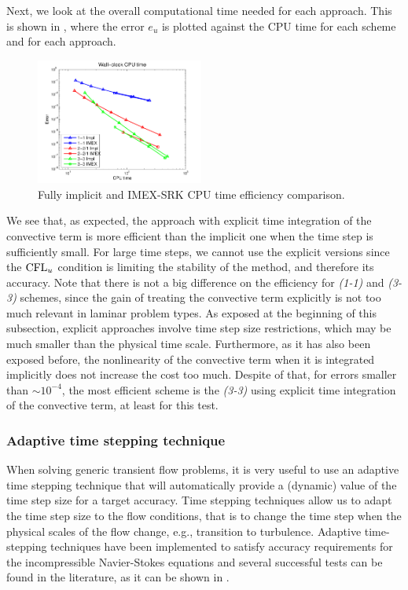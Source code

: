 Next, we look at the overall computational time needed for each approach. This is shown in , where the error $e_u$ is plotted against the CPU time for each scheme and for each approach.
\begin{figure}[h!]
  \centering
  \includegraphics[width=0.49\textwidth]{Figures/Chapter6/cylinder/Efficiency_impl_expl}  
  \caption{Fully implicit and IMEX-SRK CPU time efficiency comparison.}
  \label{fig-IMEX_RK_cyl_effi_impl_expl}
\end{figure}
We see that, as expected, the approach with explicit time integration of the convective term is more efficient than the implicit one when the time step is sufficiently small. For large time steps, we cannot use the explicit versions since the ${\rm CFL}_u$ condition is limiting the stability of the method, and therefore its accuracy. Note that there is not a big difference on the efficiency for \textit{(1-1)} and \textit{(3-3)} schemes, since the gain of treating the convective term explicitly is not too much relevant in laminar problem types. As exposed at the beginning of this subsection, explicit approaches involve time step size restrictions, which may be much smaller than the physical time scale. Furthermore, as it has also been exposed before, the nonlinearity of the convective term when it is integrated implicitly does not increase the cost too much. Despite of that, for errors smaller than $\sim10^{-4}$, the most efficient scheme is the \textit{(3-3)} using explicit time integration of the convective term, at least for this test.

\subsubsection{Adaptive time stepping technique}
When solving generic transient flow problems, it is very useful to use an adaptive time stepping technique that will automatically provide a (dynamic) value of the time step size for a target accuracy. Time stepping techniques allow us to adapt the time step size to the flow conditions, that is to change the time step when the physical scales of the flow change, e.g., transition to turbulence. Adaptive time-stepping techniques have been implemented to satisfy accuracy requirements for the incompressible Navier-Stokes equations and several successful tests can be found in the literature, as it can be shown in \cite{feng_time-adaptive_2000,john_adaptive_2010,kay_adaptive_2010,veneziani_aladins:_2013}. 

